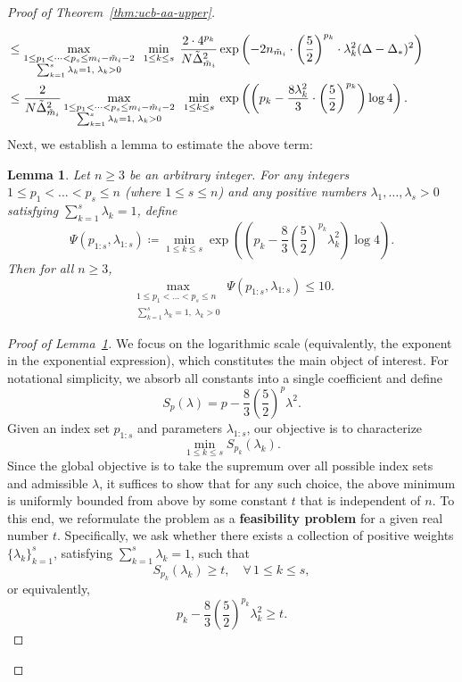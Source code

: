 \documentclass[
  12pt]{article}
\newtheorem{lemma}{Lemma}
\begin{document}
\begin{proof}[Proof of Theorem~\ref{thm:ucb-aa-upper}]
\begin{itemize}
\begin{itemize}
\begin{align}
    &\!\!\!\!\!\!\!\!\!\!\!\!\!\!\!\!\leq \max_{\substack{1\leq p_1<\cdots <p_{s}\leq m_i-\tilde{m}_i-2\\ \sum _{k=1}^{s}\lambda_k= 1,\; \lambda_k>0}}\;\;\min_{1\leq k\leq s}\;\frac{2\cdot 4^{p_k}}{N\tilde{\Delta}_{\tilde{m}_i}^2}\exp\left(-2n_{\tilde{m}_i}\cdot \left(\frac{5}{2}\right)^{p_k}\cdot \lambda_k^2(\Delta-\Delta_*)^2\right)\notag\\
   & \!\!\!\!\!\!\!\!\!\!\!\!\!\!\!\!\leq \frac{2}{N\tilde{\Delta}_{\tilde{m}_i}^2}\max_{\substack{1\leq p_1<\cdots <p_{s}\leq m_i-\tilde{m}_i-2\\ \sum _{k=1}^{s}\lambda_k= 1,\; \lambda_k>0}}\;\;\min_{1\leq k\leq s}\;\exp\left(\left(p_k-\frac{8\lambda_k^2}{3}\cdot \left(\frac{5}{2}\right)^{p_k}\right)\log 4\right).
    \label{eq: A-3 G-3 b2 optimization newest}
\end{align}
Next, we establish a lemma to estimate the above term:
\begin{lemma}
\label{Lemma 1}    
Let \( n \geq 3 \) be an arbitrary integer. For any integers \( 1 \leq p_1 < \dots < p_s \leq n \) (where \( 1 \leq s \leq n \)) and any positive numbers \( \lambda_1, \dots, \lambda_s > 0 \) satisfying \( \sum_{k=1}^s \lambda_k = 1 \), define
\[
\Psi(p_{1:s}, \lambda_{1:s}) \coloneqq \min_{1 \leq k \leq s} \exp\left( \left( p_k - \frac{8}{3} \left( \frac{5}{2} \right)^{p_k} \lambda_k^2 \right) \log 4 \right).
\]
Then for all \( n \geq 3 \),
\[
\max_{\substack{1 \leq p_1 < \dots < p_s \leq n \\ \sum _{k=1}^{s}\lambda_k= 1,\; \lambda_k>0}} \Psi(p_{1:s}, \lambda_{1:s}) \leq 10.
\]
\end{lemma}
\begin{proof}[Proof of Lemma~\ref{Lemma 1}]
    We focus on the logarithmic scale (equivalently, the exponent in the exponential expression), which constitutes the main object of interest. For notational simplicity, we absorb all constants into a single coefficient and define
\[
S_p(\lambda) = p - \frac{8}{3} \left( \frac{5}{2} \right)^p \lambda^2.
\]
Given an index set \( p_{1:s} \) and parameters \( \lambda_{1:s} \), our objective is to characterize
\[
\min_{1 \leq k \leq s} S_{p_k}(\lambda_k).
\]
Since the global objective is to take the supremum over all possible index sets and admissible $\lambda$, it suffices to show that for any such choice, the above minimum is uniformly bounded from above by some constant $t$ that is independent of $n$. To this end, we reformulate the problem as a \textbf{feasibility problem} for a given real number \( t \). Specifically, we ask whether there exists a collection of positive weights \( \{\lambda_k\}_{k=1}^s \), satisfying \( \sum_{k=1}^s \lambda_k = 1 \), such that
\[
S_{p_k}(\lambda_k) \geq t ,\quad \forall\, 1\leq k\leq s,
\]
or equivalently,
\[
p_k - \frac{8}{3} \left( \frac{5}{2} \right)^{p_k} \lambda_k^2 \geq t.
\]


\end{proof}
\end{itemize}
\end{itemize}
\end{proof}
\end{document}
